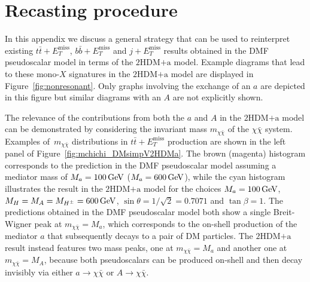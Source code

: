 \documentclass[a4paper, 11pt,notoc]{article}
\newcommand{\MET}{\ensuremath{E_T^\mathrm{miss}}\xspace}
\newcommand{\mA}{\ensuremath{M_{A}}\xspace}
\newcommand{\ma}{\ensuremath{M_{a}}\xspace}
\newcommand{\mH}{\ensuremath{M_{H}}\xspace}
\newcommand{\mHc}{\ensuremath{M_{H^{\pm}}}\xspace}
\newcommand{\hdma}{\ensuremath{\textrm{2HDM+a}}\xspace}
\begin{document}
\appendix

\section{Recasting procedure}
\label{app:recast}

In this appendix we discuss  a general strategy that can be used to reinterpret existing $t \bar t + \MET$, $b \bar b + \MET$ and $j + \MET$ results obtained in the DMF pseudoscalar model in terms of the \hdma model. Example diagrams that lead to these mono-$X$ signatures in the \hdma model are displayed in Figure~\ref{fig:nonresonant}. Only graphs involving the exchange of an $a$ are depicted in this figure but similar diagrams  with an  $A$ are not explicitly shown. 

 The relevance of the contributions from both the $a$ and $A$ in the \hdma model can be  demonstrated by considering the invariant mass $m_{\chi \bar \chi}$ of the $\chi \bar \chi$ system. Examples of~$m_{\chi \bar \chi}$ distributions in $t \bar t + \MET$ production are shown in the left panel of Figure~\ref{fig:mchichi_DMsimpV2HDMa}. The brown (magenta) histogram corresponds to the prediction in the DMF pseudoscalar model assuming a mediator mass of $\ma =100 \, {\rm  GeV}$ ($\ma =600 \, {\rm  GeV}$), while the cyan histogram illustrates the result in the \hdma model for the choices $\ma = 100 \, {\rm  GeV}$, $\mH = \mA = \mHc = 600 \, {\rm  GeV}$, $\sin\theta=1/\sqrt{2}=0.7071$ and $\tan\beta=1$. The predictions obtained in the  DMF pseudoscalar model both show a single  Breit-Wigner  peak  at $m_{\chi \bar \chi} = \ma$, which corresponds to the on-shell production of the mediator $a$ that subsequently decays to a pair of DM particles. The \hdma result instead features two mass peaks, one at $m_{\chi \bar \chi} = \ma$ and another one at $m_{\chi \bar \chi} = \mA$, because both pseudoscalars can be produced on-shell and then decay invisibly via either $a \to \chi \bar \chi$ or $A \to \chi \bar \chi$.  
\end{document}
